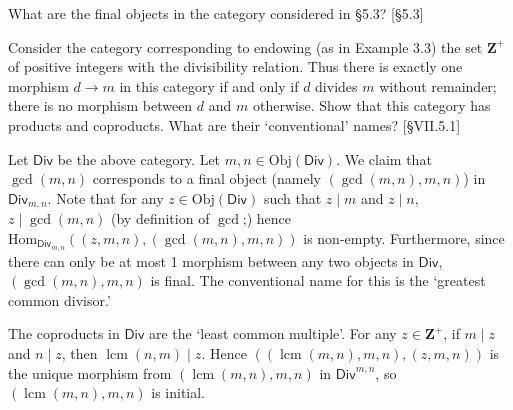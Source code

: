 \documentclass[12pt,letterpaper,boxed]{hmcpset}
\newcommand{\Obj}{\mathrm{Obj}}
\newcommand{\Hom}{\mathrm{Hom}}
\DeclareMathOperator{\lcm}{lcm}
\begin{document}
\begin{problem}[5.5]
	What are the final objects in the category considered in \S5.3? [\S5.3]
\end{problem}
\begin{solution}
\end{solution}

\begin{problem}[5.6]
	Consider the category corresponding to endowing (as in Example 3.3) the set
	$\mathbf{Z}^+$ of positive integers with the divisibility relation. Thus there
	is exactly one morphism $d\to m$ in this category if and only if $d$ divides $m$
	without remainder; there is no morphism between $d$ and $m$ otherwise. Show that
	this category has products and coproducts. What are their `conventional' names?
	[\S VII.5.1]
\end{problem}
\begin{solution}
	Let $\mathsf{Div}$ be the above category. Let $m,n\in\Obj(\mathsf{Div})$. We claim that $\gcd(m,n)$ corresponds to a final object (namely $(\gcd(m,n),m,n)$) in $\mathsf{Div}_{m,n}$. Note that for any $z\in\Obj(\mathsf{Div})$ such that $z\mid m$ and $z\mid
	n$, $z\mid\gcd(m,n)$ (by definition of $\gcd$;) hence $\Hom_{\mathsf{Div}_{m,n}}((z,m,n),(\gcd(m,n),m,n))$ is non-empty. Furthermore, since there can only be at most 1 morphism between any two objects in $\mathsf{Div}$, $(\gcd(m,n),m,n)$ is final. The conventional name for this is the `greatest common divisor.'
	
	The coproducts in $\mathsf{Div}$ are the `least common multiple'. For any
	$z\in\mathbf{Z}^+$, if $m\mid z$ and $n\mid z$, then $\lcm(n,m)\mid z$. Hence $((\lcm(m,n),m,n),(z,m,n))$ is the unique morphism from $(\lcm(m,n),m,n)$ in $\mathsf{Div}^{m,n}$, so $(\lcm(m,n),m,n)$ is initial.
\end{solution}
\end{document}

